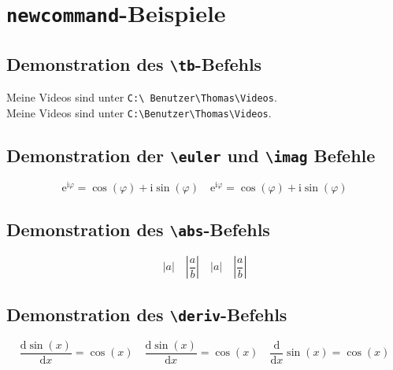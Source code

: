 \documentclass[12pt,a4paper]{scrartcl}
\newcommand{\tb}{\textbackslash}
\newcommand{\imag}{\mathrm{i}}
\newcommand{\euler}{\mathrm{e}}
\newcommand{\abs}[1]{\left|#1\right|}
\newcommand{\deriv}[2]{\frac{\mathrm{d} #1}{\mathrm{d} #2}}
\begin{document}
%
\section{\texttt{newcommand}-Beispiele}
%
%
\subsection{Demonstration des \texttt{\tb tb}-Befehls}
Meine Videos sind unter \texttt{C:\textbackslash
Benutzer\textbackslash Thomas\textbackslash Videos}. \\
Meine Videos sind unter \texttt{C:\tb Benutzer\tb Thomas\tb Videos}.
%
\subsection{Demonstration der \texttt{\tb euler} und
\texttt{\tb imag} Befehle}
\[
  \mathrm{e}^{\mathrm{i}\varphi}=\cos(\varphi)+\mathrm{i}\sin(\varphi)
  \quad
  \euler^{\imag\varphi}=\cos(\varphi)+\imag\sin(\varphi)
\]
%
\subsection{Demonstration des \texttt{\tb abs}-Befehls}
\[
  \left|a\right| \quad \left|\frac{a}{b}\right| \quad
  \abs{a} \quad \abs{\frac{a}{b}}
\]
%
\subsection{Demonstration des \texttt{\tb deriv}-Befehls}
\[
  \frac{\mathrm{d}\sin(x)}{\mathrm{d}x}=\cos(x) \quad
  \deriv{\sin(x)}{x}=\cos(x)\quad
  \deriv{}{x}\sin(x)=\cos(x)
\]
\end{document}
